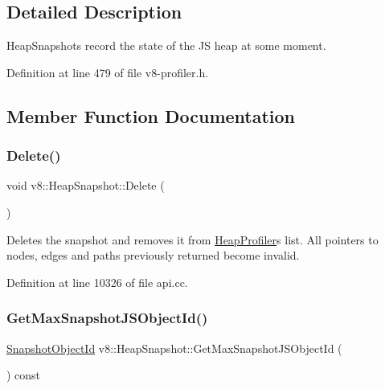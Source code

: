 \subsection{Detailed Description}
Heap\+Snapshots record the state of the JS heap at some moment. 

Definition at line 479 of file v8-\/profiler.\+h.



\subsection{Member Function Documentation}
\mbox{\label{classv8_1_1HeapSnapshot_aeaa6073009e4041839dff7a860d2548a}} 
\subsubsection{\texorpdfstring{Delete()}{Delete()}}
{\footnotesize\ttfamily void v8\+::\+Heap\+Snapshot\+::\+Delete (\begin{DoxyParamCaption}{ }\end{DoxyParamCaption})}

Deletes the snapshot and removes it from \mbox{\hyperlink{classv8_1_1HeapProfiler}{Heap\+Profiler}}\textquotesingle{}s list. All pointers to nodes, edges and paths previously returned become invalid. 

Definition at line 10326 of file api.\+cc.

\mbox{\label{classv8_1_1HeapSnapshot_ab85fc78102f4e7a3c4f2bf66a3665908}} 
\subsubsection{\texorpdfstring{Get\+Max\+Snapshot\+J\+S\+Object\+Id()}{GetMaxSnapshotJSObjectId()}}
{\footnotesize\ttfamily \mbox{\hyperlink{classuint32__t}{Snapshot\+Object\+Id}} v8\+::\+Heap\+Snapshot\+::\+Get\+Max\+Snapshot\+J\+S\+Object\+Id (\begin{DoxyParamCaption}{ }\end{DoxyParamCaption}) const}

